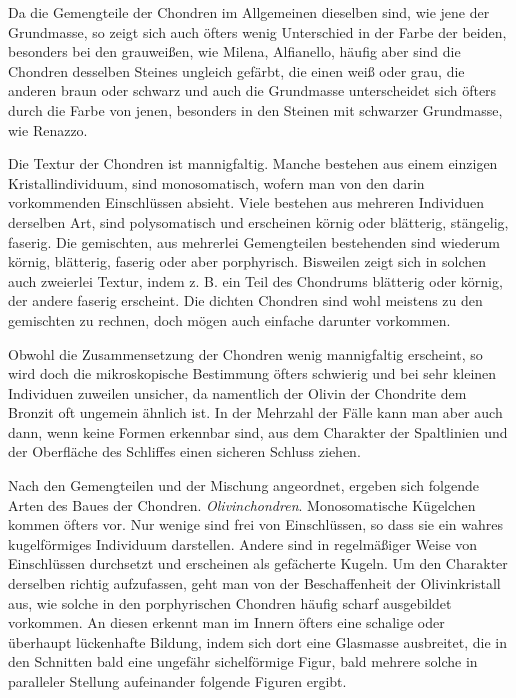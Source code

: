 \documentclass[a4paper, 11pt, oneside, polutonikogreek, german]{article}
\begin{document}
Da die Gemengteile der Chondren im Allgemeinen dieselben sind, wie jene der Grundmasse, so zeigt sich auch öfters wenig Unterschied in der Farbe der beiden, besonders bei den grauweißen, wie Milena, Alfianello, häufig aber sind die Chondren desselben Steines ungleich gefärbt, die einen weiß oder grau, die anderen braun oder schwarz und auch die Grundmasse unterscheidet sich öfters durch die Farbe von jenen, besonders in den Steinen mit schwarzer Grundmasse, wie Renazzo.

Die Textur der Chondren ist mannigfaltig. Manche bestehen aus einem einzigen Kristallindividuum, sind monosomatisch, wofern man von den darin vorkommenden Einschlüssen absieht. Viele bestehen aus mehreren Individuen derselben Art, sind polysomatisch und erscheinen körnig oder blätterig, stängelig, faserig. Die gemischten, aus mehrerlei Gemengteilen bestehenden sind wiederum körnig, blätterig, faserig oder aber porphyrisch. Bisweilen zeigt sich in solchen auch zweierlei Textur, indem z. B. ein Teil des Chondrums blätterig oder körnig, der andere faserig erscheint. Die dichten Chondren sind wohl meistens zu den gemischten zu rechnen, doch mögen auch einfache darunter vorkommen.

Obwohl die Zusammensetzung der Chondren wenig mannigfaltig erscheint, so wird doch die mikroskopische Bestimmung öfters schwierig und bei sehr kleinen Individuen zuweilen unsicher, da namentlich der Olivin der Chondrite dem Bronzit oft ungemein ähnlich ist. In der Mehrzahl der Fälle kann man aber auch dann, wenn keine Formen erkennbar sind, aus dem Charakter der Spaltlinien und der Oberfläche des Schliffes einen sicheren Schluss ziehen.

Nach den Gemengteilen und der Mischung angeordnet, ergeben sich folgende Arten des Baues der Chondren. \emph{Olivinchondren}. Monosomatische Kügelchen kommen öfters vor. Nur wenige sind frei von Einschlüssen, so dass sie ein wahres kugelförmiges Individuum darstellen. Andere sind in regelmäßiger Weise von Einschlüssen durchsetzt und erscheinen als gefächerte Kugeln. Um den Charakter derselben richtig aufzufassen, geht man von der Beschaffenheit der Olivinkristall aus, wie solche in den porphyrischen Chondren häufig scharf ausgebildet vorkommen. An diesen erkennt man im Innern öfters eine schalige oder überhaupt lückenhafte Bildung, indem sich dort eine Glasmasse ausbreitet, die in den Schnitten bald eine ungefähr sichelförmige Figur, bald mehrere solche in paralleler Stellung aufeinander folgende Figuren ergibt.
\end{document}
